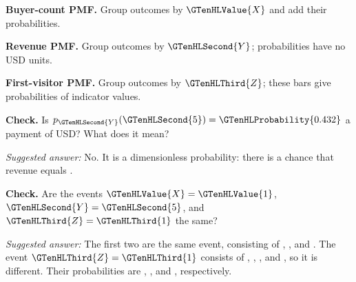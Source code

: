 \Needspace{6.8cm}
\par\noindent \begin{minipage}[t]{.485\linewidth}
\centering
{}
\par\small \textbf{Buyer-count PMF.} Group outcomes by $\GTenHLValue{X}$ and add their probabilities.
\end{minipage}\hfill\begin{minipage}[t]{.485\linewidth}
\centering
{}
\par\small \textbf{Revenue PMF.} Group outcomes by $\GTenHLSecond{Y}$; probabilities have no USD units.
\end{minipage}\par\medskip
\Needspace{6.8cm}
\par\noindent \begin{minipage}[t]{.485\linewidth}
\centering
{}
\par\small \textbf{First-visitor PMF.} Group outcomes by $\GTenHLThird{Z}$; these bars give probabilities of indicator values.
\end{minipage}\par\medskip


\textbf{Check.} Is $p_{\GTenHLSecond{Y}}(\GTenHLSecond{5})=\GTenHLProbability{0.432}$ a payment of  USD? What does it mean?

\emph{Suggested answer:} No. It is a dimensionless probability: there is a  chance that revenue equals .

\textbf{Check.} Are the events $\GTenHLValue{X}=\GTenHLValue{1}$, $\GTenHLSecond{Y}=\GTenHLSecond{5}$, and $\GTenHLThird{Z}=\GTenHLThird{1}$ the same?

\emph{Suggested answer:} The first two are the same event, consisting of , , and . The event $\GTenHLThird{Z}=\GTenHLThird{1}$ consists of , , , and , so it is different. Their probabilities are , , and , respectively.

